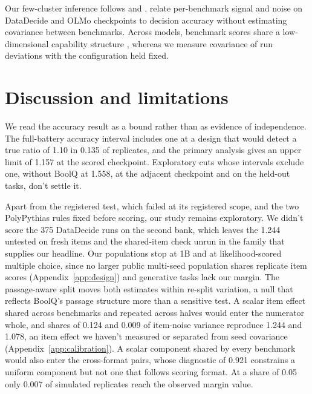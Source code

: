 Our few-cluster inference follows \citet{cameron2008} and \citet{mackinnon2017}. \citet{heineman2025} relate per-benchmark signal and noise on DataDecide and OLMo checkpoints to decision accuracy without estimating covariance between benchmarks. Across models, benchmark scores share a low-dimensional capability structure \citep{ruan2024,burnell2023revealing}, whereas we measure covariance of run deviations with the configuration held fixed.

\section{Discussion and limitations}
We read the accuracy result as a bound rather than as evidence of independence. The full-battery accuracy interval includes one at a design that would detect a true ratio of 1.10 in 0.135 of replicates, and the primary analysis gives an upper limit of 1.157 at the scored checkpoint. Exploratory cuts whose intervals exclude one, without BoolQ at 1.558, at the adjacent checkpoint and on the held-out tasks, don't settle it.

Apart from the registered test, which failed at its registered scope, and the two PolyPythias rules fixed before scoring, our study remains exploratory. We didn't score the 375 DataDecide runs on the second bank, which leaves the 1.244 untested on fresh items and the shared-item check unrun in the family that supplies our headline. Our populations stop at 1B and at likelihood-scored multiple choice, since no larger public multi-seed population shares replicate item scores (Appendix~\ref{app:design}) and generative tasks lack our margin. The passage-aware split moves both estimates within re-split variation, a null that reflects BoolQ's passage structure more than a sensitive test. A scalar item effect shared across benchmarks and repeated across halves would enter the numerator whole, and shares of 0.124 and 0.009 of item-noise variance reproduce 1.244 and 1.078, an item effect we haven't measured or separated from seed covariance (Appendix~\ref{app:calibration}). A scalar component shared by every benchmark would also enter the cross-format pairs, whose diagnostic of 0.921 constrains a uniform component but not one that follows scoring format. At a share of 0.05 only 0.007 of simulated replicates reach the observed margin value.

